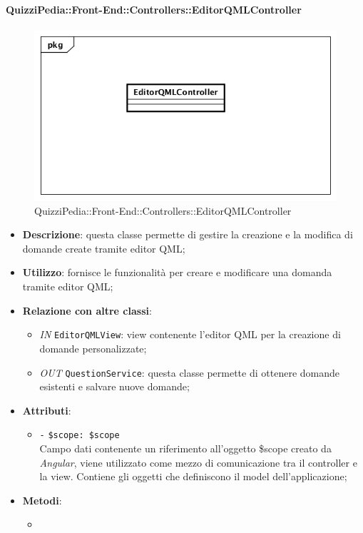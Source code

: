 \paragraph{QuizziPedia::Front-End::Controllers::EditorQMLController}
\begin{figure} [ht]
	\centering
	\includegraphics[scale=0.45]{UML/Classi/Front-End/QuizziPedia_Front-end_Controller_EditorQMLController.png}
	\caption{QuizziPedia::Front-End::Controllers::EditorQMLController}
\end{figure} \FloatBarrier
\begin{itemize}
	\item \textbf{Descrizione}: questa classe permette di gestire la creazione e la modifica di domande create tramite editor QML;
	\item \textbf{Utilizzo}: fornisce le funzionalità per creare e modificare una domanda tramite editor QML;
	\item \textbf{Relazione con altre classi}:
	\begin{itemize}
		\item \textit{IN} \texttt{EditorQMLView}: view contenente l'editor QML per la creazione di domande personalizzate; 
		\item \textit{OUT} \texttt{QuestionService}: questa classe permette di ottenere domande esistenti e salvare nuove domande;
	\end{itemize}
	\item \textbf{Attributi}:
	\begin{itemize}
		\item \texttt{-} \texttt{\$scope: \$scope} \\
		Campo dati contenente un riferimento all’oggetto \$scope creato da \textit{Angular}, viene utilizzato come mezzo di comunicazione tra il controller e la view. Contiene gli oggetti che definiscono il model dell’applicazione;
	\end{itemize}
	\item \textbf{Metodi}:
	\begin{itemize}
		\item 
	\end{itemize}
\end{itemize}

